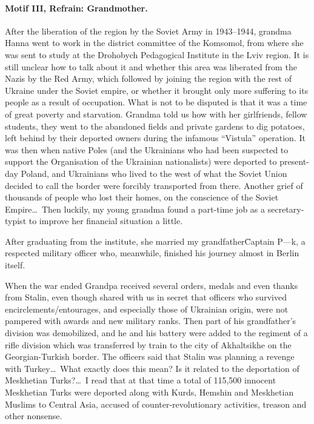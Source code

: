 \paragraph{Motif III, Refrain: Grandmother.}

After the liberation of the region by the Soviet Army in 1943--1944,
grandma Hanna went to work in the district committee of the Komsomol,
from where she was sent to study at the Drohobych Pedagogical
Institute in the Lviv region. It is still unclear how to talk about it
and whether this area was liberated from the Nazis by the Red Army,
which followed by joining the region with the rest of Ukraine under
the Soviet empire, or whether it brought only more suffering to its
people as a result of occupation. What is not to be disputed is that
it was a time of great poverty and starvation. Grandma told us how
with her girlfriends, fellow students, they went to the abandoned
fields and private gardens to dig potatoes, left behind by their
deported owners during the infamous ``Vistula'' operation. It was then
when native Poles (and the Ukrainians who had been suspected to
support the Organisation of the Ukrainian nationalists) were deported
to present-day Poland, and Ukrainians who lived to the west of what
the Soviet Union decided to call the border were forcibly transported
from there. Another grief of thousands of people who lost their homes,
on the conscience of the Soviet Empire\ldots\ Then luckily, my young
grandma found a part-time job as a secretary-typist to improve her
financial situation a little.

After graduating from the institute, she married my
grandfather\=Captain P---k, a respected military officer who,
meanwhile, finished his journey almost in Berlin itself.

When the war ended Grandpa received several orders, medals and even
thanks from Stalin, even though shared with us in secret that officers
who survived encirclements/entourages, and especially those of
Ukrainian origin, were not pampered with awards and new military
ranks. Then part of his grandfather's division was demobilized, and he
and his battery were added to the regiment of a rifle division which
was transferred by train to the city of Akhaltsikhe on the
Georgian-Turkish border. The officers said that Stalin was planning a
revenge with Turkey\ldots\ What exactly does this mean? Is it related
to the deportation of Meskhetian Turks?\ldots\ I read that at that time
a total of 115,500 innocent Meskhetian Turks were deported along with
Kurds, Hemshin and Meskhetian Muslims to Central Asia, accused of
counter-revolutionary activities, treason and other nonsense.

